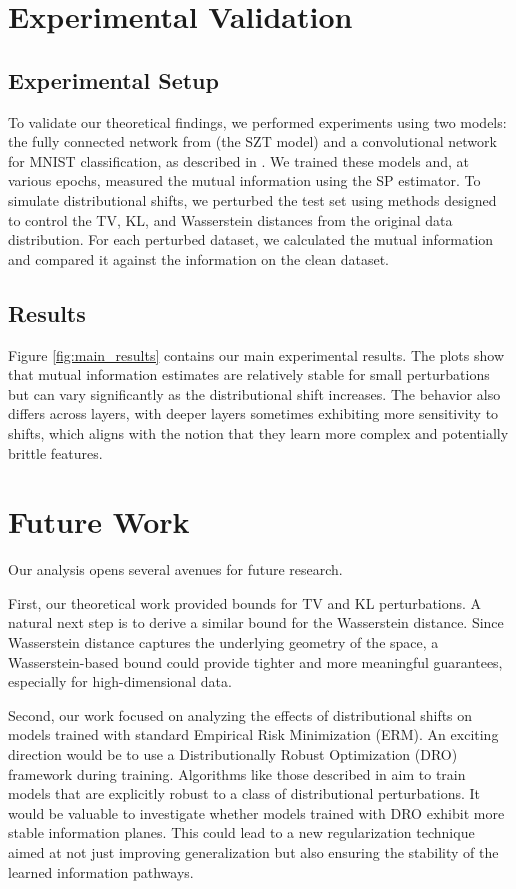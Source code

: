 \documentclass[conference]{IEEEtran}
\begin{document}
\section{Experimental Validation}

\subsection{Experimental Setup}
To validate our theoretical findings, we performed experiments using two models: the fully connected network from \cite{shwartz2017opening} (the SZT model) and a convolutional network for MNIST classification, as described in \cite{goldfeld2019estimating}. We trained these models and, at various epochs, measured the mutual information using the SP estimator. To simulate distributional shifts, we perturbed the test set using methods designed to control the TV, KL, and Wasserstein distances from the original data distribution. For each perturbed dataset, we calculated the mutual information and compared it against the information on the clean dataset.

\subsection{Results}
Figure \ref{fig:main_results} contains our main experimental results. The plots show that mutual information estimates are relatively stable for small perturbations but can vary significantly as the distributional shift increases. The behavior also differs across layers, with deeper layers sometimes exhibiting more sensitivity to shifts, which aligns with the notion that they learn more complex and potentially brittle features.

\section{Future Work}
Our analysis opens several avenues for future research.

First, our theoretical work provided bounds for TV and KL perturbations. A natural next step is to derive a similar bound for the Wasserstein distance. Since Wasserstein distance captures the underlying geometry of the space, a Wasserstein-based bound could provide tighter and more meaningful guarantees, especially for high-dimensional data.

Second, our work focused on analyzing the effects of distributional shifts on models trained with standard Empirical Risk Minimization (ERM). An exciting direction would be to use a Distributionally Robust Optimization (DRO) framework during training. Algorithms like those described in \cite{duchi2018certifying} aim to train models that are explicitly robust to a class of distributional perturbations. It would be valuable to investigate whether models trained with DRO exhibit more stable information planes. This could lead to a new regularization technique aimed at not just improving generalization but also ensuring the stability of the learned information pathways.
\end{document}
